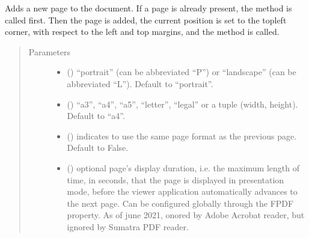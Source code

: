 \documentclass[letterpaper,10pt,english]{sphinxmanual}
\begin{document}
\begin{fulllineitems}
\begin{fulllineitems}
\label{\detokenize{generated/quality_assessment.quality_pdf_report.DefectReportPDF.add_page:quality_assessment.quality_pdf_report.DefectReportPDF.add_page}}
\sphinxAtStartPar
Adds a new page to the document.
If a page is already present, the  method is called first.
Then the page  is added, the current position is set to the top\sphinxhyphen{}left corner,
with respect to the left and top margins, and the  method is called.
\begin{quote}\begin{description}
\item[{Parameters}] \leavevmode\begin{itemize}
\item {} 
\sphinxAtStartPar
{} () \textendash{} “portrait” (can be abbreviated “P”)
or “landscape” (can be abbreviated “L”). Default to “portrait”.

\item {} 
\sphinxAtStartPar
{} () \textendash{} “a3”, “a4”, “a5”, “letter”, “legal” or a tuple
(width, height). Default to “a4”.

\item {} 
\sphinxAtStartPar
{} () \textendash{} indicates to use the same page format as the previous page.
Default to False.

\item {} 
\sphinxAtStartPar
{} () \textendash{} optional page’s display duration, i.e. the maximum length of time,
in seconds, that the page is displayed in presentation mode,
before the viewer application automatically advances to the next page.
Can be configured globally through the  FPDF property.
As of june 2021, onored by Adobe Acrobat reader, but ignored by Sumatra PDF reader.


\end{itemize}
\end{description}
\end{quote}
\end{fulllineitems}
\end{fulllineitems}
\end{document}
